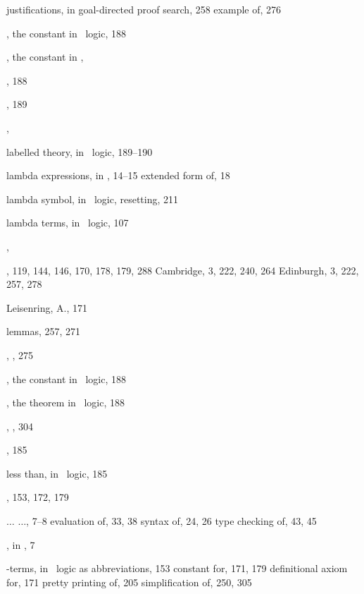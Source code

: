 \begin{theindex}
  \indexspace

  \item justifications, in goal-directed proof search, 258
    \subitem {} example of, 276

  \indexspace

  \item {}, the constant in \HOL\ logic, 188
  \item {}, the constant in \ML, 
  \item {}, 188
  \item {}, 189
  \item {}, 

  \indexspace

  \item labelled  theory, in \HOL\ logic, 189--190
  \item lambda expressions, in \ML, 14--15
    \subitem extended form of, 18
  \item lambda symbol, in \HOL\ logic, resetting, 211
  \item lambda terms, in \HOL\ logic, 107
  \item {}, 
  \item \LCF, 119, 144, 146, 170, 178, 179, 288
    \subitem Cambridge, 3, 222, 240, 264
    \subitem Edinburgh, 3, 222, 257, 278
  \item Leisenring, A., 171
  \item lemmas, 257, 271
  \item {}, , 275
  \item {}, the constant in \HOL\ logic, 188
  \item {}, the theorem in \HOL\ logic, 188
  \item {}, , 304
  \item {}, 185
  \item less than, in \HOL\ logic, 185
  \item {}, 153, 172, 179
  \item {} $\ldots$  $\ldots$, 7--8
    \subitem evaluation of, 33, 38
    \subitem syntax of, 24, 26
    \subitem type checking of, 43, 45
  \item {}, in \ML, 7
  \item {}-terms, in \HOL\ logic
    \subitem as abbreviations, 153
    \subitem constant for, 171, 179
    \subitem definitional axiom for, 171
    \subitem pretty printing of, 205
    \subitem simplification of, 250, 305

\end{theindex}
